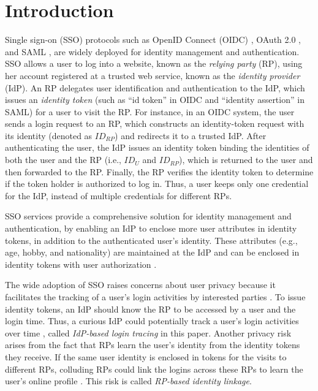 \section{Introduction}
\label{sec:intro}
Single sign-on (SSO) protocols such as OpenID Connect (OIDC) \cite{OpenIDConnect}, OAuth 2.0 \cite{rfc6749}, and SAML \cite{SAML, SAMLIdentifier}, are widely deployed for identity management and authentication.
SSO allows a user to log into a website,
 known as the \emph{relying party} (RP), using her account registered at a trusted web service, known as the \emph{identity provider} (IdP).
An RP delegates user identification and authentication to the IdP, which issues an \emph{identity token} (such as ``id token'' in OIDC and ``identity assertion'' in SAML) for a user to visit the RP.
For instance, in an OIDC system, the user sends a login request to an RP,
which constructs an identity-token request with its identity (denoted as $ID_{RP}$) and redirects it to a trusted IdP. After authenticating the user, the IdP issues an identity token binding the identities of both the user and the RP (i.e., $ID_U$ and $ID_{RP}$), which is returned to the user and then forwarded to the RP.
Finally, the RP verifies the identity token to determine if the token holder is authorized to log in. Thus, a user keeps only one credential for the IdP, instead of multiple credentials for different RPs.

SSO services provide a comprehensive solution for identity management and authentication,
 by enabling an IdP to enclose more user attributes in identity tokens, in addition to the authenticated user's identity.
These attributes (e.g., age, hobby, and nationality) are maintained at the IdP and can be enclosed in identity tokens with user authorization \cite{OpenIDConnect,rfc6749}.

The wide adoption of SSO raises concerns about user privacy because it facilitates the tracking of a user's login activities by interested parties \cite{NIST2017draft, SPRESSO, BrowserID, maler2008venn}.
To issue identity tokens, an IdP should know the RP to be accessed by a user and the login time.
Thus, a curious IdP could potentially track a user's login activities over time
 \cite{BrowserID, SPRESSO},
called {\em IdP-based login tracing} in this paper.
Another privacy risk arises from the fact that RPs learn the user's identity from the identity tokens they receive.
If the same user identity is enclosed in tokens for the visits to different RPs, colluding RPs could link the logins across these RPs %
to learn the user's online profile  \cite{maler2008venn, Google, FirefoxAccount}.
This risk is called {\em RP-based identity linkage}. %


